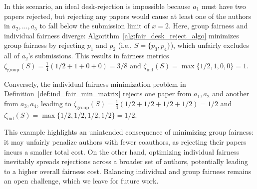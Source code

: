 In this scenario, an ideal desk-rejection is impossible because $a_1$ must have two papers rejected, but rejecting any papers would cause at least one of the authors in $a_2, \ldots, a_5$ to fall below the submission limit of $x=2$. Here, group fairness and individual fairness diverge: Algorithm~\ref{alg:fair_desk_reject_algo} minimizes group fairness by rejecting $p_1$ and $p_2$ (i.e., $S = \{p_3, p_4\}$), which unfairly excludes all of $a_2$'s submissions. This results in fairness metrics $\zeta_{\mathrm{group}}(S) = \frac{1}{4}(1/2 + 1 + 0 + 0) = 3/8$ and $\zeta_{\mathrm{ind}}(S) = \max\{1/2, 1, 0, 0\} = 1$. 

Conversely, the individual fairness minimization problem in Definition~\ref{def:ind_fair_min_matrix} rejects one paper from $a_1, a_2$ and another from $a_3, a_4$, leading to $\zeta_{\mathrm{group}}(S) = \frac{1}{4}(1/2 + 1/2 + 1/2 + 1/2) = 1/2$ and $\zeta_{\mathrm{ind}}(S) = \max\{1/2, 1/2, 1/2, 1/2\} = 1/2$.

This example highlights an unintended consequence of minimizing group fairness: it may unfairly penalize authors with fewer coauthors, as rejecting their papers incurs a smaller total cost. On the other hand, optimizing individual fairness inevitably spreads rejections across a broader set of authors, potentially leading to a higher overall fairness cost. Balancing individual and group fairness remains an open challenge, which we leave for future work.

